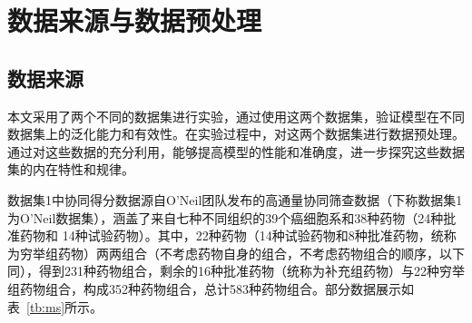 
\chapter{数据来源与数据预处理}
\label{chap:theory}

\section{数据来源}

本文采用了两个不同的数据集进行实验，通过使用这两个数据集，验证模型在不同数据集上的泛化能力和有效性。在实验过程中，对这两个数据集进行数据预处理。通过对这些数据的充分利用，能够提高模型的性能和准确度，进一步探究这些数据集的内在特性和规律。

数据集1中协同得分数据源自O'Neil团队发布的高通量协同筛查数据\cite{17}（下称数据集1为O'Neil数据集），涵盖了来自七种不同组织的39个癌细胞系和38种药物（24种批准药物和 14种试验药物）。其中，22种药物（14种试验药物和8种批准药物，统称为穷举组药物）两两组合（不考虑药物自身的组合，不考虑药物组合的顺序，以下同），得到231种药物组合，剩余的16种批准药物（统称为补充组药物）与22种穷举组药物组合，构成352种药物组合，总计583种药物组合。部分数据展示如表~\ref{tb:ms}所示。


